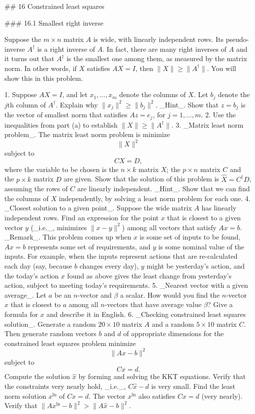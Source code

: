 

## 16 Constrained least squares

### 16.1 Smallest right inverse

Suppose the \(m\times n\) matrix \(A\) is wide, with linearly independent rows. Its pseudo-inverse \(A^{\dagger}\) is a right inverse of \(A\). In fact, there are many right inverses of \(A\) and it turns out that \(A^{\dagger}\) is the smallest one among them, as measured by the matrix norm. In other words, if \(X\) satisfies \(AX=I\), then \(\|X\|\geq\|A^{\dagger}\|\). You will show this in this problem.

1. Suppose \(AX=I\), and let \(x_{1},\ldots,x_{m}\) denote the columns of \(X\). Let \(b_{j}\) denote the \(j\)th column of \(A^{\dagger}\). Explain why \(\|x_{j}\|^{2}\geq\|b_{j}\|^{2}\). _Hint_. Show that \(z=b_{j}\) is the vector of smallest norm that satisfies \(Az=e_{j}\), for \(j=1,\ldots,m\).
2. Use the inequalities from part (a) to establish \(\|X\|\geq\|A^{\dagger}\|\).
3. _Matrix least norm problem_. The matrix least norm problem is minimize \[\|X\|^{2}\] subject to \[CX=D,\] where the variable to be chosen is the \(n\times k\) matrix \(X\); the \(p\times n\) matrix \(C\) and the \(p\times k\) matrix \(D\) are given. Show that the solution of this problem is \(\hat{X}=C^{\dagger}D\), assuming the rows of \(C\) are linearly independent. _Hint_. Show that we can find the columns of \(X\) independently, by solving a least norm problem for each one.
4. _Closest solution to a given point_. Suppose the wide matrix \(A\) has linearly independent rows. Find an expression for the point \(x\) that is closest to a given vector \(y\) (_i.e._, minimizes \(\|x-y\|^{2}\)) among all vectors that satisfy \(Ax=b\). _Remark_. This problem comes up when \(x\) is some set of inputs to be found, \(Ax=b\) represents some set of requirements, and \(y\) is some nominal value of the inputs. For example, when the inputs represent actions that are re-calculated each day (say, because \(b\) changes every day), \(y\) might be yesterday's action, and the today's action \(x\) found as above gives the least change from yesterday's action, subject to meeting today's requirements.
5. _Nearest vector with a given average_. Let \(a\) be an \(n\)-vector and \(\beta\) a scalar. How would you find the \(n\)-vector \(x\) that is closest to \(a\) among all \(n\)-vectors that have average value \(\beta\)? Give a formula for \(x\) and describe it in English.
6. _Checking constrained least squares solution_. Generate a random \(20\times 10\) matrix \(A\) and a random \(5\times 10\) matrix \(C\). Then generate random vectors \(b\) and \(d\) of appropriate dimensions for the constrained least squares problem minimize \[\|Ax-b\|^{2}\] subject to \[Cx=d.\] Compute the solution \(\hat{x}\) by forming and solving the KKT equations. Verify that the constraints very nearly hold, _i.e._, \(C\hat{x}-d\) is very small. Find the least norm solution \(x^{\mathrm{ln}}\) of \(Cx=d\). The vector \(x^{\mathrm{ln}}\) also satisfies \(Cx=d\) (very nearly). Verify that \(\|Ax^{\mathrm{ln}}-b\|^{2}>\|A\hat{x}-b\|^{2}\).
